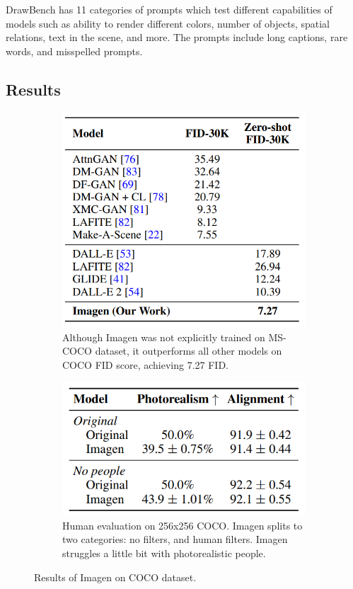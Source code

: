 DrawBench has 11 categories of prompts which test different capabilities of models such as ability to render different colors, number of objects, spatial relations, text in the scene, and more. The prompts include long captions, rare words, and misspelled prompts.














\subsection{Results}

\begin{figure}[t!]
    \centering
    \begin{subfigure}{0.4\textwidth}
        \includegraphics[width=0.6\linewidth]{images/imagen/imagen_coco_zeroshot.png}
        \caption{Although Imagen was not explicitly trained on MS-COCO dataset, it outperforms all other models on COCO FID score, achieving 7.27 FID.}
        \label{fig:imagen_coco_zeroshot}
    \end{subfigure}
    \begin{subfigure}{0.4\textwidth}
        \includegraphics[width=0.6\linewidth]{images/imagen/imagen_coco_human_eval.png}
        \caption{Human evaluation on 256x256 COCO. Imagen splits to two categories: no filters, and human filters. Imagen struggles a little bit with photorealistic people.}
        \label{fig:imagen_coco_human_eval}
    \end{subfigure}
    \caption{Results of Imagen on COCO dataset.}
\end{figure}

